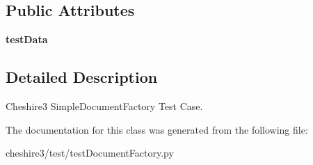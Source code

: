 \subsection*{Public Attributes}
\begin{DoxyCompactItemize}
\item 
\hypertarget{classcheshire3_1_1test_1_1test_document_factory_1_1_simple_document_factory_test_case_a4dc1a0cf412b949414b1658e1240ee98}{{\bfseries test\-Data}}\label{classcheshire3_1_1test_1_1test_document_factory_1_1_simple_document_factory_test_case_a4dc1a0cf412b949414b1658e1240ee98}

\end{DoxyCompactItemize}


\subsection{Detailed Description}
\begin{DoxyVerb}Cheshire3 SimpleDocumentFactory Test Case.\end{DoxyVerb}
 

The documentation for this class was generated from the following file\-:\begin{DoxyCompactItemize}
\item 
cheshire3/test/test\-Document\-Factory.\-py\end{DoxyCompactItemize}
